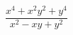 \begin{ex}[type=expression]
	\begin{condition}
		\(\dfrac{x^4+x^2y^2+y^4}{x^2-xy+y^2}\)
	\end{condition}
\end{ex}